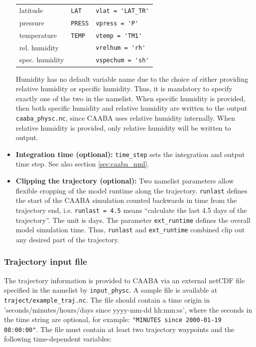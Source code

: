 \documentclass[twoside]{article}
\begin{document}
\begin{itemize}
\begin{center}
\begin{tabular}{lll}
      latitude       & \verb|LAT|   & \verb|vlat = 'LAT_TR'|\\
      pressure       & \verb|PRESS| & \verb|vpress = 'P'|\\
      temperature    & \verb|TEMP|  & \verb|vtemp = 'TM1'|\\
      rel. humidity  &              & \verb|vrelhum = 'rh'|\\
      spec. humidity &              & \verb|vspechum = 'sh'|\\
      \hline
    \end{tabular}
  \end{center}
  Humidity has no default variable name due to the choice of either
  providing relative humidity or specific humidity. Thus, it is
  mandatory to specify exactly one of the two in the namelist. When
  specific humidity is provided, then both specific humidity and
  relative humidity are written to the output \verb|caaba_physc.nc|,
  since CAABA uses relative humidity internally. When relative humidity
  is provided, only relative humidity will be written to output.
\item \textbf{Integration time (optional):} \verb|time_step| sets the
  integration and output time step. See also section
  \ref{sec:caaba_nml}.
\item \textbf{Clipping the trajectory (optional):} Two namelist
  parameters allow flexible cropping of the model runtime along the
  trajectory. \verb|runlast| defines the start of the CAABA simulation
  counted backwards in time from the trajectory end, i.e.
  \verb|runlast = 4.5| means ``calculate the last 4.5 days of the
  trajectory''. The unit is days. The parameter \verb|ext_runtime|
  defines the overall model simulation time. Thus, \verb|runlast| and
  \verb|ext_runtime| combined clip out any desired part of the
  trajectory.
\end{itemize}

\subsubsection{Trajectory input file}
\label{sec:trajfile}

The trajectory information is provided to CAABA via an external netCDF
file specified in the namelist by \verb|input_physc|. A sample file is
available at \verb|traject/example_traj.nc|. The file should contain a
time origin in 'seconds/minutes/hours/days since yyyy-mm-dd hh:mm:ss',
where the seconds in the time string are optional, for example:
\verb|"MINUTES since 2000-01-19 08:00:00"|. The file must contain at
least two trajectory waypoints and the following time-dependent
variables:
\end{document}
